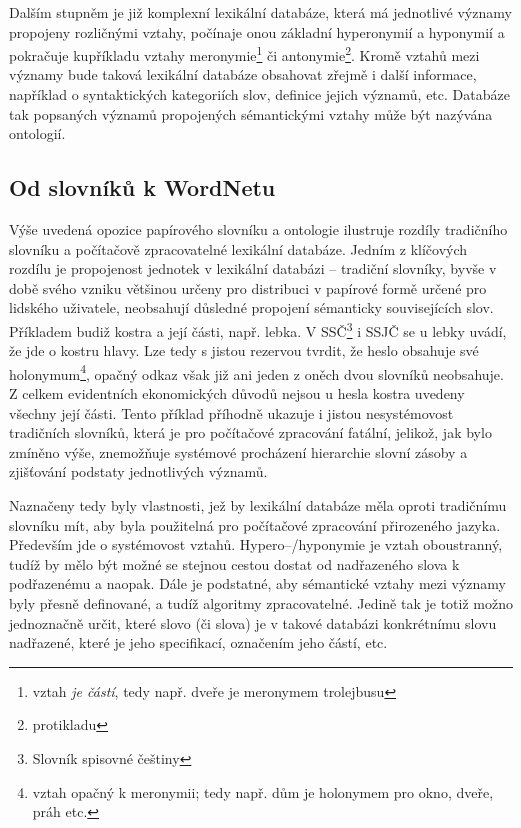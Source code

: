 \documentclass[a4paper, 11pt, oneside]{book}
\newcommand\ex{\textsf}
\begin{document}
					Dalším stupněm je již komplexní lexikální databáze, která má jednotlivé významy propojeny rozličnými vztahy, počínaje onou základní hyperonymií a hyponymií a pokračuje kupříkladu vztahy meronymie\footnote{vztah \textit{je částí}, tedy např. \ex{dveře} je meronymem \ex{trolejbusu}} či antonymie\footnote{protikladu}. Kromě vztahů mezi významy bude taková lexikální databáze obsahovat zřejmě i další informace, například o syntaktických kategoriích slov, definice jejich významů, etc. Databáze tak popsaných významů propojených sémantickými vztahy může být nazývána ontologií. \parencite{garshol2004metadata}

				\subsection{Od slovníků k WordNetu}

					Výše uvedená opozice papírového slovníku a ontologie ilustruje rozdíly tradičního slovníku a počítačově zpracovatelné lexikální databáze. Jedním z klíčových rozdílu je propojenost jednotek v lexikální databázi -- tradiční slovníky, byvše v době svého vzniku většinou určeny pro distribuci v papírové formě určené pro lidského uživatele, neobsahují důsledné propojení sémanticky souvisejících slov. Příkladem budiž \ex{kostra} a její části, např. \ex{lebka}. V SSČ\footnote{Slovník spisovné češtiny} i SSJČ se u \ex{lebky} uvádí, že jde o \ex{kostru hlavy}. Lze tedy s jistou rezervou tvrdit, že heslo obsahuje své holonymum\footnote{vztah opačný k meronymii; tedy např. \ex{dům} je holonymem pro \ex{okno}, \ex{dveře}, \ex{práh} etc.}, opačný odkaz však již ani jeden z oněch dvou slovníků neobsahuje. Z celkem evidentních ekonomických důvodů nejsou u hesla \ex{kostra} uvedeny všechny její části. Tento příklad příhodně ukazuje i jistou nesystémovost tradičních slovníků, která je pro počítačové zpracování fatální, jelikož, jak bylo zmíněno výše, znemožňuje systémové procházení hierarchie slovní zásoby a zjišťování podstaty jednotlivých významů.

					Naznačeny tedy byly vlastnosti, jež by lexikální databáze měla oproti tradičnímu slovníku mít, aby byla použitelná pro počítačové zpracování přirozeného jazyka. Především jde o systémovost vztahů. Hypero--/hyponymie je vztah oboustranný, tudíž by mělo být možné se stejnou cestou dostat od nadřazeného slova k podřazenému a naopak. Dále je podstatné, aby sémantické vztahy mezi významy byly přesně definované, a tudíž algoritmy zpracovatelné. Jedině tak je totiž možno jednoznačně určit, které slovo (či slova) je v takové databázi konkrétnímu slovu nadřazené, které je jeho specifikací, označením jeho částí, etc. 
\end{document}
